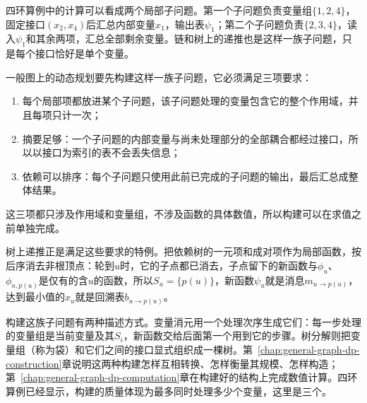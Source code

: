 四环算例中的计算可以看成两个局部子问题。第一个子问题负责变量组$\{1,2,4\}$，固定接口$(x_2,x_4)$后汇总内部变量$x_1$，输出表$\psi_1$；第二个子问题负责$\{2,3,4\}$，读入$\psi_1$和其余两项，汇总全部剩余变量。链和树上的递推也是这样一族子问题，只是每个接口恰好是单个变量。

一般图上的动态规划要先构建这样一族子问题，它必须满足三项要求：
\begin{enumerate}
  \item 每个局部项都放进某个子问题，该子问题处理的变量包含它的整个作用域，并且每项只计一次；
  \item 摘要足够：一个子问题的内部变量与尚未处理部分的全部耦合都经过接口，所以以接口为索引的表不会丢失信息；
  \item 依赖可以排序：每个子问题只使用此前已完成的子问题的输出，最后汇总成整体结果。
\end{enumerate}
这三项都只涉及作用域和变量组，不涉及函数的具体数值，所以构建可以在求值之前单独完成。

树上递推正是满足这些要求的特例。把依赖树的一元项和成对项作为局部函数，按后序消去非根顶点：轮到$u$时，它的子点都已消去，子点留下的新函数与$\phi_u$、$\phi_{u,p(u)}$是仅有的含$u$的函数，所以$S_u=\{p(u)\}$，新函数$\psi_u$就是消息$m_{u\to p(u)}$，达到最小值的$x_u$就是回溯表$b_{u\to p(u)}$。

构建这族子问题有两种描述方式。变量消元用一个处理次序生成它们：每一步处理的变量组是当前变量及其$S_i$，新函数交给后面第一个用到它的步骤。树分解则把变量组（称为袋）和它们之间的接口显式组织成一棵树。第~\ref{chap:general-graph-dp-construction}章说明这两种构建怎样互相转换、怎样衡量其规模、怎样构造；第~\ref{chap:general-graph-dp-computation}章在构建好的结构上完成数值计算。四环算例已经显示，构建的质量体现为最多同时处理多少个变量，这里是三个。
